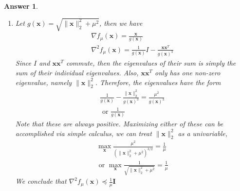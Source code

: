 \documentclass[12pt]{article}
\theoremstyle{colon}
\newtheorem*{answer}{Answer}
\begin{document}
\begin{answer}
	\
	\begin{enumerate}[label=\alph*)]
		\item Let $g(\bm{x}) = \sqrt{\lVert \bm{x} \rVert_2^2 + \mu^2}$, then we have
			\begin{gather*}
				\nabla f_\mu (\bm{x}) = \frac{\bm{x}}{g(\bm{x})} \\
				\nabla^2 f_\mu(\bm{x}) = \frac{1}{g(\bm{x})} I - \frac{\bm{x} \bm{x}^T}{g(\bm{x})^3}
			\end{gather*}
			Since $I$ and $\bm{x} \bm{x}^T$ commute, then the eigenvalues of their sum is simply the sum of their individual eigenvalues. Also, $\bm{x} \bm{x}^T$ only has one non-zero eigenvalue, namely $\lVert \bm{x} \rVert_2^2$. Therefore, the eigenvalues have the form
			\begin{gather*}
				\frac{1}{g(\bm{x})} - \frac{\lVert \bm{x} \rVert_2^2}{g(\bm{x})^3}  = \frac{\mu^2}{g(\bm{x})^3}\\ 
				\text{ or } \frac{1}{g(\bm{x})}
			\end{gather*}
			Note that these are always positive. Maximizing either of these can be accomplished via simple calculus, we can treat $\lVert \bm{x} \rVert_2^2$ as a univariable,
			\begin{gather*}
				\max_{\bm{x}} \frac{\mu^2}{(\lVert \bm{x} \rVert_2^2 + \mu^2)^{3/2}} = \frac{1}{\mu} \\
				\text{ or } \max_{\bm{x}} \frac{1}{\sqrt{\lVert \bm{x} \rVert_2^2 + \mu^2}} = \frac{1}{\mu}
			\end{gather*}
			We conclude that $\nabla^2 f_\mu(\bm{x}) \preceq \frac{1}{\mu} \bm{I}$


\end{enumerate}
\end{answer}
\end{document}
